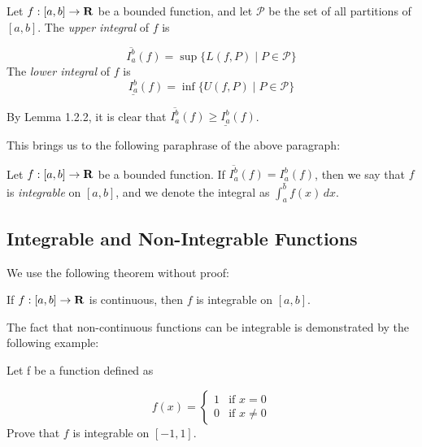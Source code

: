 \documentclass{article}
\begin{document}
  \begin{defi}
    Let \(f: [a,b] \to \mathbf{R}\) be a bounded function, and let \(\mathcal{P}\) be the set of all partitions of \([a,b]\). The \emph{upper integral} of \(f\) is

    \[
      \overline{I_{a}^{b}}(f) = \sup\{L(f, P) \mid P \in \mathcal{P}\}
    \]
    The \emph{lower integral} of \(f\) is
    \[
      \underline{I_{a}^{b}}(f) = \inf\{U(f, P) \mid P \in \mathcal{P}\}
    \]
  \end{defi}

  \begin{remark}
    By Lemma 1.2.2, it is clear that \(\overline{I_{a}^{b}}(f) \geq \underline{I_{a}^{b}}(f)\).
  \end{remark}

  This brings us to the following paraphrase of the above paragraph:

  \begin{defi}[Integrability]
    Let \(f: [a,b] \to \mathbf{R}\) be a bounded function. If \(\overline{I_{a}^{b}}(f) = \underline{I_{a}^{b}}(f)\), then we say that \(f\) is \emph{integrable} on \([a,b]\), and we denote the integral as \(\int_{a}^{b}{f(x) \,dx}\).
  \end{defi}


\subsection{Integrable and Non-Integrable Functions}

  We use the following theorem without proof:

  \begin{thm}
    If \(f:[a,b] \to \mathbf{R}\) is continuous, then \(f\) is integrable on \([a,b]\).
  \end{thm}

  The fact that non-continuous functions can be integrable is demonstrated by the following example:

  \begin{eg}
    Let f be a function defined as 

    \[
      f(x) = \begin{cases}
        1 & \text{if } x = 0 \\
        0 & \text{if } x \neq 0
      \end{cases}
    \]
    Prove that \(f\) is integrable on \([-1,1]\).
  \end{eg}
\end{document}
